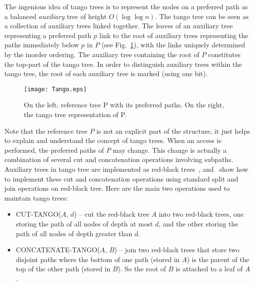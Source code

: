 \documentclass[letterpaper,11pt]{article}
\newcounter{todo}
\newcommand{\todo}[1]{}
\begin{document}
The ingenious idea of tango trees is to represent the nodes on a preferred
path as a balanced \emph{auxiliary} tree of height $O(\log \log n)$. The
tango tree can be seen as a collection of auxiliary trees linked
together. The leaves of an auxiliary tree representing a preferred path $p$
link to the root of auxiliary trees representing the paths immediately
below $p$ in $P$ (see Fig.~\ref{fig-tango}), with the links uniquely
determined by the inorder ordering. The auxiliary tree containing the root
of $P$ constitutes the top-part of the tango tree. In order to distinguish
auxiliary trees within the tango tree, the root of each auxiliary tree is
marked (using one bit).

\begin{figure}\begin{center}
        \texttt{[image: Tango.eps]}
    \end{center}
    \caption{\label{fig-tango} On the left, reference tree P with its
    preferred paths. On the right, the tango tree representation of P.}
\end{figure}

\todo{Why are the same letters used repeatedly for different subtrees in
Fig.~\ref{fig-tango}?  Rolf.}

Note that the reference tree $P$ is not an explicit part of the structure,
it just helps to explain and understand the concept of tango trees. When an
access is performed, the preferred paths of $P$ may change. This change is
actually a combination of several cut and concatenation operations
involving subpaths. Auxiliary trees in tango tree are implemented as
red-black trees~\cite{redblack}, and~\cite{tango} show how to implement
these cut and concatenation operations using standard split and join
operations on red-black tree. Here are the main two operations used to
maintain tango trees:
\begin{itemize}
\item C{\scriptsize UT}-T{\scriptsize ANGO}($A$, $d$) -- cut the red-black tree $A$ into two red-black trees, one storing the path of all nodes of depth at most $d$, and the other storing the path of all nodes of depth greater than $d$.
\item C{\scriptsize ONCATENATE}-T{\scriptsize ANGO}($A$, $B$) -- join two red-black trees that store two disjoint paths where the bottom of one path (stored in $A$) is the parent of the top of the other path (stored in $B$). So the root of $B$ is attached to a leaf of $A$. 
\end{itemize}
\end{document}
